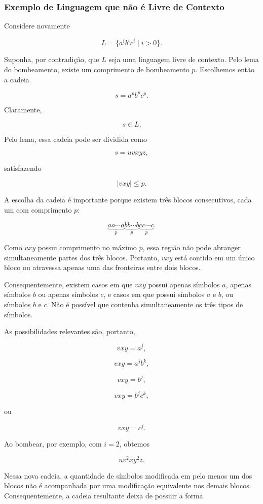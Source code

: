 \documentclass[
  brazilian,
  letterpaper,
]{book}
\theoremstyle{plain}
\theoremstyle{definition}
\theoremstyle{remark}
\begin{document}
\subsubsection{Exemplo de Linguagem que não é Livre de
Contexto}\label{exemplo-de-linguagem-que-nuxe3o-uxe9-livre-de-contexto}

Considere novamente

\[
L=\{a^ib^ic^i\mid i>0\}.
\]

Suponha, por contradição, que \(L\) seja uma linguagem livre de
contexto. Pelo lema do bombeamento, existe um comprimento de bombeamento
\(p\). Escolhemos então a cadeia

\[
s=a^pb^pc^p.
\]

Claramente,

\[
s\in L.
\]

Pelo lema, essa cadeia pode ser dividida como

\[
s=uvxyz,
\]

satisfazendo

\[
|vxy|\leq p.
\]

A escolha da cadeia é importante porque existem três blocos
consecutivos, cada um com comprimento \(p\):

\[
\underbrace{aa\cdots a}_{p}
\underbrace{bb\cdots b}_{p}
\underbrace{cc\cdots c}_{p}.
\]

Como \(vxy\) possui comprimento no máximo \(p\), essa região não pode
abranger simultaneamente partes dos três blocos. Portanto, \(vxy\) está
contido em um único bloco ou atravessa apenas uma das fronteiras entre
dois blocos.

Consequentemente, existem casos em que \(vxy\) possui apenas símbolos
\(a\), apenas símbolos \(b\) ou apenas símbolos \(c\), e casos em que
possui símbolos \(a\) e \(b\), ou símbolos \(b\) e \(c\). Não é possível
que contenha simultaneamente os três tipos de símbolos.

As possibilidades relevantes são, portanto,

\[
vxy=a^j,
\]

\[
vxy=a^jb^k,
\]

\[
vxy=b^j,
\]

\[
vxy=b^jc^k,
\]

ou

\[
vxy=c^j.
\]

Ao bombear, por exemplo, com \(i=2\), obtemos

\[
uv^2xy^2z.
\]

Nessa nova cadeia, a quantidade de símbolos modificada em pelo menos um
dos blocos não é acompanhada por uma modificação equivalente nos demais
blocos. Consequentemente, a cadeia resultante deixa de possuir a forma
\end{document}
